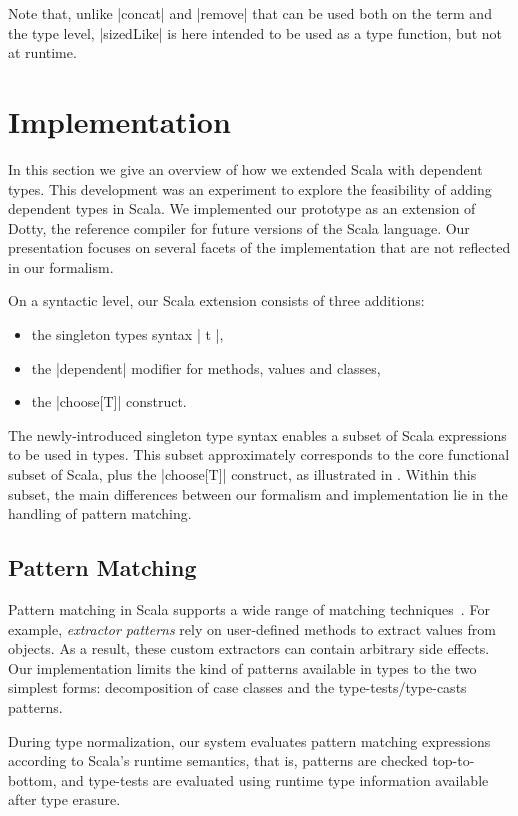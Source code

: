 Note that, unlike |concat| and |remove| that can be used both on the term and the type level, |sizedLike| is here intended to be used as a type function, but not at runtime.

\section{Implementation}
\label{sec:extending-scala}

In this section we give an overview of how we extended Scala with dependent types.
This development was an experiment to explore the feasibility of adding dependent types in Scala.
We implemented our prototype as an extension of Dotty, the reference compiler for future versions of the Scala language.
Our presentation focuses on several facets of the implementation that are not reflected in our formalism.

On a syntactic level, our Scala extension consists of three additions:

\begin{itemize}
\item
  the singleton types syntax |{ t }|,
\item
  the |dependent| modifier for methods, values and classes,
\item
  the |choose[T]| construct.
\end{itemize}

\noindent
The newly-introduced singleton type syntax enables a subset of Scala expressions to be used in types.
This subset approximately corresponds to the core functional subset of Scala, plus the |choose[T]| construct, as illustrated in \oursystem.
Within this subset, the main differences between our formalism and implementation lie in the handling of pattern matching.

\subsection{Pattern Matching}
\label{pattern-matching}

Pattern matching in Scala supports a wide range of matching techniques~\citep{emir2007matching}.
For example, \emph{extractor patterns} rely on user-defined methods to extract values from objects.
As a result, these custom extractors can contain arbitrary side effects.
Our implementation limits the kind of patterns available in types to the two simplest forms: decomposition of case classes and the type-tests/type-casts patterns.

During type normalization, our system evaluates pattern matching expressions according to Scala's runtime semantics, that is, patterns are checked top-to-bottom, and type-tests are evaluated using runtime type information available after type erasure.

